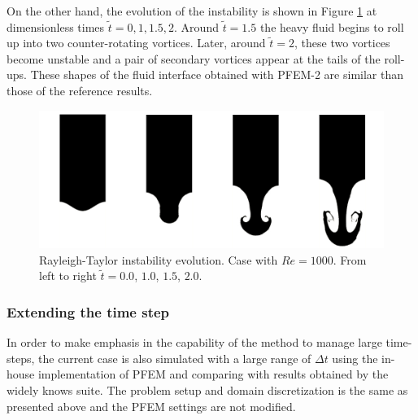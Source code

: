 On the other hand, the evolution of the instability is shown in Figure \ref{fg:rayleigh-screenshots} at dimensionless times $\widetilde{t}=0, 1, 1.5, 2$. Around $\widetilde{t}=1.5$ the heavy fluid begins to roll up into two counter-rotating vortices. Later, around $\widetilde{t} = 2$, these two vortices become unstable and a pair of secondary vortices appear at the tails of the roll-ups. These shapes of the fluid interface obtained with PFEM-2 are similar than those of the reference results.


\begin{figure}[htbp]
  \begin{center}
      \includegraphics[width=\columnwidth]{images/rayleigh_2_better.jpg}
  \end{center}
  \caption{\label{fg:rayleigh-screenshots} Rayleigh-Taylor instability evolution. Case with $Re=1000$. From left to right $\widetilde{t} =0.0$, $1.0$, $1.5$, $2.0$.}
\end{figure}

\subsubsection{Extending the time step}

In order to make emphasis in the capability of the method to manage large time-steps, the current case is also simulated with a large range of $\Delta t$ using the in-house implementation of PFEM and comparing with results obtained by the widely knows \OF suite. The problem setup and domain discretization is the same as presented above and the PFEM settings are not modified. 


